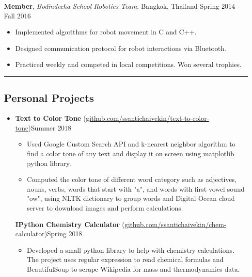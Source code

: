 \documentclass[10.5pt,letterpaper]{article}
\begin{document}
\begin{itemize}
\begin{itemize}[label=\textbullet]
    \end{itemize}
    
    {\textbf{Member}, \textit{Bodindecha School Robotics Team}, Bangkok, Thailand \hfill {Spring 2014 - Fall 2016}}
     
    \begin{itemize}[label=\textbullet]
      \itemsep0.1em
      \item Implemented algorithms for robot movement in C and C++.
      \item Designed communication protocol for robot interactions via Bluetooth.
      \item Practiced weekly and competed in local competitions. Won several trophies.
      
    \end{itemize}


  \end{itemize}
  
\hrule
\vspace{-1.0em}
\subsection*{Personal Projects}
  \begin{itemize}
    \parskip=-0.2em
    \item[]
    {\textbf{Text to Color Tone} (\href{https://github.com/ssantichaivekin/text-to-color-tone}
    {github.com/ssantichaivekin/text-to-color-tone})\hfill {Summer 2018}}
    \begin{itemize}[label=\textbullet]
        \item  Used Google Custom Search API and k-nearest neighbor algorithm to find a color tone 
        of any text and display it on screen using matplotlib python library.
        \item  Computed the color tone of different word category such as adjectives, nouns, verbs, 
        words that start with "a", and words with first vowel sound "ow", using NLTK dictionary to 
        group words and Digital Ocean cloud server to download images and perform calculations.
    \end{itemize}
    {\textbf{IPython Chemistry Calculator} (\href{https://github.com/ssantichaivekin/chem-calculator}
    {github.com/ssantichaivekin/chem-calculator})\hfill {Spring 2018}}
    \begin{itemize}[label=\textbullet]
        \item  Developed a small python library to help with chemistry calculations. 
        The project uses regular expression to read chemical formulas and BeautifulSoup to scrape 
        Wikipedia for mass and thermodynamics data.
    \end{itemize}
  \end{itemize}
\end{document}
